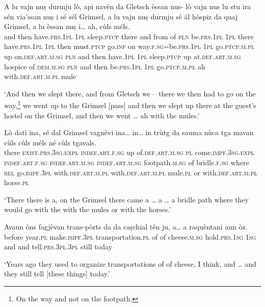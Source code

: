\begin{linenumbers}
\gll   A lu vajn nuṣ durmju lò, api navèn da Gletsch èssan nus- lò vajn nus lu stu ira sén via’ssan nuṣ i sé sél Grimsel, a lu vajn nuṣ durmju sé ál hòspiz da quaj Grimsel, a lu èssan nuṣ i… ah, cùls méls. \\
and then  have.\textsc{prs.1pl} \textsc{1pl} sleep.\textsc{ptcp} there and from of \textsc{pln} be.\textsc{prs.1pl} \textsc{1pl} there have.\textsc{prs.1pl}  \textsc{1pl} then must.\textsc{ptcp} go.\textsc{inf} on way.\textsc{f.sg}=be.\textsc{prs.1pl} \textsc{1pl} go.\textsc{ptcp.m.pl} up on.\textsc{def.art.m.sg}  \textsc{pln} and then have.\textsc{1pl} \textsc{1pl} sleep.\textsc{ptcp} up at.\textsc{def.art.m.sg} hospice of \textsc{dem.m.sg} \textsc{pln} and then be.\textsc{prs.1pl}  \textsc{1pl} go.\textsc{ptcp.m.pl} ah with.\textsc{def.art.m.pl}  mule \\
\end{linenumbers}
\medskip
\glt `And then we slept there, and from Gletsch we – there we then had to go on the way,\footnote{On the way and not on the footpath.} we went up to the Grimsel [pass] and then we slept up there at the guest’s hostel on the Grimsel, and then we went … ah with the mules.'
\medskip

\begin{linenumbers}
\gll Lò dati ina, sé dal Grimsel vagnévi ina… in… in trùtg da sauma nùca tga mavan cùls cùls méls né cùls tgavals.   \\
there \textsc{exist.prs.3sg.expl} \textsc{indef.art.f.sg} up of.\textsc{def.art.m.sg}  \textsc{pl} come.\textsc{impf.3sg.expl} \textsc{indef.art.f.sg} \textsc{indef.art.m.sg}  \textsc{indef.art.m.sg} footpath.\textsc{m.sg} of bridle.\textsc{f.sg} where \textsc{rel} go.\textsc{impf.3pl} with.\textsc{def.art.m.pl} with.\textsc{def.art.m.pl} mule.\textsc{pl} or with.\textsc{def.art.m.pl} horse.\textsc{pl}\\
\end{linenumbers}
\medskip
\glt `There there is a, on the Grimsel there came a … a … a bridle path where they would go with the with the mules or with the horses.'
\medskip

\begin{linenumbers}
\gll Avaun òns fagjèvan trans-pòrts da da caṣchial tén ju, a… a raquèntani aun òz.   \\
 before year.\textsc{pl} make.\textsc{impf.3pl} transportation.\textsc{pl} of of cheese.\textsc{m.sg} hold.\textsc{prs.1sg} \textsc{1sg} and and  tell.\textsc{prs.3pl.3pl} still today\\
\end{linenumbers}
\medskip
\glt `Years ago they used to organize transportations of of cheese, I think, and … and they still tell [these things] today.'
\medskip

